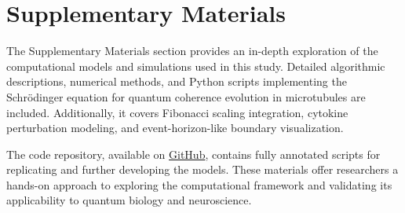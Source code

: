 \documentclass[entropy,article,submit,oneauthor,pdftex,]{Definitions/mdpi}
\begin{document}
\section*{Supplementary Materials}
The Supplementary Materials section provides an in-depth exploration of the computational models and simulations used in this study. Detailed algorithmic descriptions, numerical methods, and Python scripts implementing the Schrödinger equation for quantum coherence evolution in microtubules are included. Additionally, it covers Fibonacci scaling integration, cytokine perturbation modeling, and event-horizon-like boundary visualization.

The code repository, available on \href{https://github.com/TheonlyqueenAC/Microtubule_Simulation}{GitHub}, contains fully annotated scripts for replicating and further developing the models. These materials offer researchers a hands-on approach to exploring the computational framework and validating its applicability to quantum biology and neuroscience.
\end{document}
